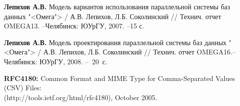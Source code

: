 \documentclass[11pt,oneside]{article}
\begin{document}
\begin{thebibliography}{X}
 {\bf Лепихов А.В.} {\sf Модель вариантов использования параллельной  системы баз данных "<Омега">} / А.В. Лепихов, Л.Б. Соколинский // Технич. отчет OMEGA13. --Челябинск: ЮУрГУ, 2007. --15 с.\vspace{-2mm}

 {\bf Лепихов А.В.} {\sf Модель проектирования параллельной  системы баз данных "<Омега">} / А.В. Лепихов, Л.Б. Соколинский // Технич. отчет OMEGA16.--Челябинск: ЮУрГУ, 2008. --~20~с.\vspace{-2mm}

 {\bf RFC4180:} {\sf Common Format and MIME Type for Comma-Separated Values (CSV) Files:}\\ (http://tools.ietf.org/html/rfc4180), October 2005. \vspace{-2mm}

\end{thebibliography}
\end{document}
